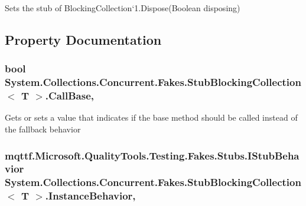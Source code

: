 Sets the stub of Blocking\-Collection`1.Dispose(\-Boolean disposing)



\subsection{Property Documentation}
\hypertarget{class_system_1_1_collections_1_1_concurrent_1_1_fakes_1_1_stub_blocking_collection_3_01_t_01_4_a18245f1c31fe69dc6f64dbb2a6c1fe1a}{
\subsubsection[{Call\-Base}]{\setlength{\rightskip}{0pt plus 5cm}bool System.\-Collections.\-Concurrent.\-Fakes.\-Stub\-Blocking\-Collection$<$ T $>$.Call\-Base\hspace{0.3cm}{\ttfamily [get]}, {\ttfamily [set]}}}\label{class_system_1_1_collections_1_1_concurrent_1_1_fakes_1_1_stub_blocking_collection_3_01_t_01_4_a18245f1c31fe69dc6f64dbb2a6c1fe1a}


Gets or sets a value that indicates if the base method should be called instead of the fallback behavior

\hypertarget{class_system_1_1_collections_1_1_concurrent_1_1_fakes_1_1_stub_blocking_collection_3_01_t_01_4_a8b93949ee7ea6dae722ad1a933fc39df}{
\subsubsection[{Instance\-Behavior}]{\setlength{\rightskip}{0pt plus 5cm}mqttf.\-Microsoft.\-Quality\-Tools.\-Testing.\-Fakes.\-Stubs.\-I\-Stub\-Behavior System.\-Collections.\-Concurrent.\-Fakes.\-Stub\-Blocking\-Collection$<$ T $>$.Instance\-Behavior\hspace{0.3cm}{\ttfamily [get]}, {\ttfamily [set]}}}\label{class_system_1_1_collections_1_1_concurrent_1_1_fakes_1_1_stub_blocking_collection_3_01_t_01_4_a8b93949ee7ea6dae722ad1a933fc39df}


